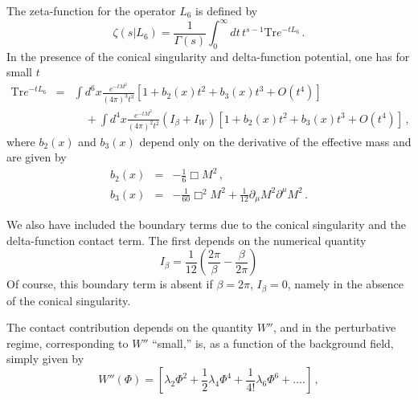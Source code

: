 \documentclass[a4paper,aps,prl,preprint,groupedaddress,showpacs,nobibnotes,tightenlines]{revtex4}
\begin{document}
The zeta-function for the operator $L_6$ is defined by 
\begin{equation}
\zeta(s|L_6)=\frac{1}{\Gamma(s)}\int_0^\infty dt\, t^{s-1}\mbox{Tr}e^{-tL_6}\,.
\end{equation}
In the presence of the conical singularity and delta-function potential,
one has for small $t$
\begin{eqnarray}
\mbox{Tr}e^{-tL_6}&=&\int d^6x \frac{e^{-tM^2}}{(4\pi)^3t^3}
\left[ 1+b_2(x)t^2+b_3(x)t^3+ O(t^4)\right]\nonumber\\
&&\quad\mbox{}+\int d^4x \frac{e^{-tM^2}}{(4\pi)^2t^2}(I_\beta+I_W)
\left[ 1+b_2(x)t^2+b_3(x)t^3+ O(t^4)\right]
\,,
\end{eqnarray}
where $b_2(x)$ and $b_3(x)$ depend only on the derivative of the 
effective mass and are given by
\begin{subequations}
\begin{eqnarray}
b_2(x)&=&-\frac{1}{6}\Box M^2\,,\,\,\\
b_3(x)&=&-\frac{1}{60}\Box^2 M^2+\frac{1}{12}\partial_\mu M^2
\partial^\mu M^2\,.
\end{eqnarray}
\end{subequations}

We also have included the boundary terms due to the conical singularity and 
the delta-function contact term. The first  depends on the numerical 
quantity \cite{cone} 
\begin{equation}
I_\beta=\frac{1}{12}\left( \frac{2\pi}{\beta}-\frac{\beta}{2\pi}\right)
\end{equation}
Of course, this boundary term is  absent if $\beta=2\pi$, $I_\beta=0$, 
 namely in the absence of the conical singularity.

 The contact contribution depends on the quantity $W''$, and in the 
perturbative regime, corresponding to $W''$ ``small,'' is, 
as a function of the background field, simply given by
\begin{equation}
W''(\Phi)=\left[\lambda_2 \Phi^2+\frac{1}{2}\lambda_4 \Phi^4+
\frac{1}{4!}\lambda_6\Phi^6+....
 \right]\,,  
\label{con}
\end{equation}
\end{document}
